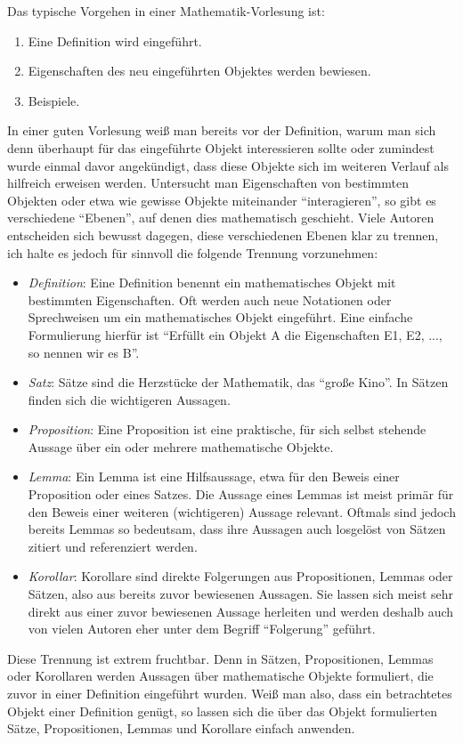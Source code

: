 \documentclass[11pt,reqno, a4paper]{book}
\theoremstyle{mystyle}
\theoremstyle{definition}
\numberwithin{equation}{chapter}
\begin{document}
Das typische Vorgehen in einer Mathematik-Vorlesung ist:
\begin{enumerate}
    \item Eine Definition wird eingeführt. 
    \item Eigenschaften des neu eingeführten Objektes werden bewiesen. 
    \item Beispiele. 
\end{enumerate}
In einer guten Vorlesung weiß man bereits vor der Definition, warum man sich denn überhaupt für das eingeführte Objekt interessieren sollte oder zumindest wurde einmal davor angekündigt, dass diese Objekte sich im weiteren Verlauf als hilfreich erweisen werden. Untersucht man Eigenschaften von bestimmten Objekten oder etwa wie gewisse Objekte miteinander "`interagieren"', so gibt es verschiedene "`Ebenen"', auf denen dies mathematisch geschieht. Viele Autoren entscheiden sich bewusst dagegen, diese verschiedenen Ebenen klar zu trennen, ich halte es jedoch für sinnvoll die folgende Trennung vorzunehmen: 
\begin{itemize}
    \item \textit{Definition}: Eine Definition benennt ein mathematisches Objekt mit bestimmten Eigenschaften. Oft werden auch neue Notationen oder Sprechweisen um ein mathematisches Objekt eingeführt. Eine einfache Formulierung hierfür ist "`Erfüllt ein Objekt A die Eigenschaften E1, E2, ..., so nennen wir es B"'. 
    
    \item \textit{Satz}: Sätze sind die Herzstücke der Mathematik, das "`große Kino"'. In Sätzen finden sich die wichtigeren Aussagen.  
    
    \item \textit{Proposition}: Eine Proposition ist eine praktische, für sich selbst stehende Aussage über ein oder mehrere mathematische Objekte.  

    \item \textit{Lemma}: Ein Lemma ist eine Hilfsaussage, etwa für den Beweis einer Proposition oder eines Satzes. Die Aussage eines Lemmas ist meist primär für den Beweis einer weiteren (wichtigeren) Aussage relevant. Oftmals sind jedoch bereits Lemmas so bedeutsam, dass ihre Aussagen auch losgelöst von Sätzen zitiert und referenziert werden. 

    \item \textit{Korollar}: Korollare sind direkte Folgerungen aus Propositionen, Lemmas oder Sätzen, also aus bereits zuvor bewiesenen Aussagen. Sie lassen sich meist sehr direkt aus einer zuvor bewiesenen Aussage herleiten und werden deshalb auch von vielen Autoren eher unter dem Begriff "`Folgerung"' geführt. 
\end{itemize}
Diese Trennung ist extrem fruchtbar. Denn in Sätzen, Propositionen, Lemmas oder Korollaren werden Aussagen über mathematische Objekte formuliert, die zuvor in einer Definition eingeführt wurden. Weiß man also, dass ein betrachtetes Objekt einer Definition genügt, so lassen sich die über das Objekt formulierten Sätze, Propositionen, Lemmas und Korollare einfach anwenden. 
\end{document}
